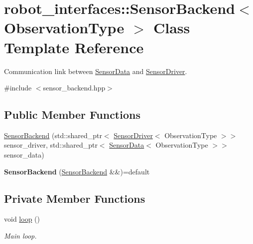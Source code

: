\hypertarget{classrobot__interfaces_1_1SensorBackend}{}\section{robot\+\_\+interfaces\+:\+:Sensor\+Backend$<$ Observation\+Type $>$ Class Template Reference}
\label{classrobot__interfaces_1_1SensorBackend}


Communication link between \hyperlink{classrobot__interfaces_1_1SensorData}{Sensor\+Data} and \hyperlink{classrobot__interfaces_1_1SensorDriver}{Sensor\+Driver}.  




{\ttfamily \#include $<$sensor\+\_\+backend.\+hpp$>$}

\subsection*{Public Member Functions}
\begin{DoxyCompactItemize}
\item 
\hyperlink{classrobot__interfaces_1_1SensorBackend_af24fda0e1d54274cf8122195f82acea9}{Sensor\+Backend} (std\+::shared\+\_\+ptr$<$ \hyperlink{classrobot__interfaces_1_1SensorDriver}{Sensor\+Driver}$<$ Observation\+Type $>$$>$ sensor\+\_\+driver, std\+::shared\+\_\+ptr$<$ \hyperlink{classrobot__interfaces_1_1SensorData}{Sensor\+Data}$<$ Observation\+Type $>$$>$ sensor\+\_\+data)
\item 
\mbox{\label{classrobot__interfaces_1_1SensorBackend_a50a8691ab6bdfb1bc39fc55266ffb76c}} 
{\bfseries Sensor\+Backend} (\hyperlink{classrobot__interfaces_1_1SensorBackend}{Sensor\+Backend} \&\&)=default
\end{DoxyCompactItemize}
\subsection*{Private Member Functions}
\begin{DoxyCompactItemize}
\item 
\mbox{\label{classrobot__interfaces_1_1SensorBackend_aee2c015c331cf8acd80b57523f10beaa}} 
void \hyperlink{classrobot__interfaces_1_1SensorBackend_aee2c015c331cf8acd80b57523f10beaa}{loop} ()
\begin{DoxyCompactList}\small\item\em Main loop. \end{DoxyCompactList}\end{DoxyCompactItemize}
